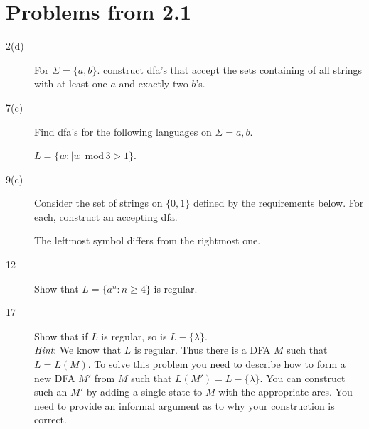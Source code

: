 \documentclass[12pt]{article}
\begin{document}
%
\section*{Problems from 2.1}

\begin{description}
    \item[2(d)] For $\Sigma = \{a, b\}$. construct dfa's that accept the
                sets containing of all strings with at least one $a$ and
                exactly two $b$'s.
\end{description}


\begin{description}
    \item[7(c)] Find dfa's for the following languages on $\Sigma = {a, b}$.

                $L = \{w : |w|\, \mathrm{mod}\, 3 > 1\}$.
\end{description}

\begin{description}
    \item[9(c)] Consider the set of strings on $\{0, 1\}$ defined by the
                requirements below.  For each, construct an accepting dfa.

                The leftmost symbol differs from the rightmost one.
\end{description}

\begin{description}
    \item[12] Show that $L = \{a^n : n \ge 4\}$ is regular.

    \item[17] Show that if $L$ is regular, so is $L - \{\lambda\}$.\\
              \emph{Hint}: We know that $L$ is regular. Thus there is a
              DFA $M$ such that $L = L(M)$. To solve this problem you
              need to describe how to form a new DFA $M'$ from $M$ such
              that $L(M') = L - \{\lambda\}$.  You can construct such an
              $M'$ by adding a single state to $M$ with the appropriate
              arcs. You need to provide an informal argument as to why
              your construction is correct.

\end{description}
\end{document}
